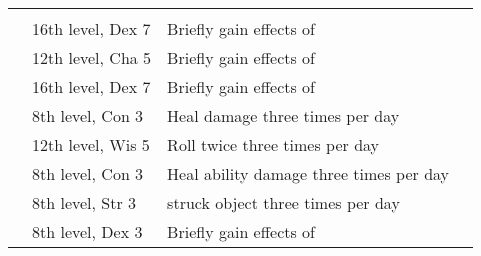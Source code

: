 {\begin{longtabu}{>{\lcol}p{15em} >{\lcol}p{15em} >{\lcol}X >{\lcol}p{10em}}
\midrule
{} &  &  \\
 & 16th level, Dex 7 & Briefly gain effects of  \\
 & 12th level, Cha 5 & Briefly gain effects of  \\
 & 16th level, Dex 7 & Briefly gain effects of  \\
 & 8th level, Con 3 & Heal damage three times per day \\
 & 12th level, Wis 5 & Roll twice three times per day \\
 & 8th level, Con 3 & Heal ability damage three times per day \\
 & 8th level, Str 3 &  struck object three times per day \\
 & 8th level, Dex 3 & Briefly gain effects of  \\
\end{longtabu}}

